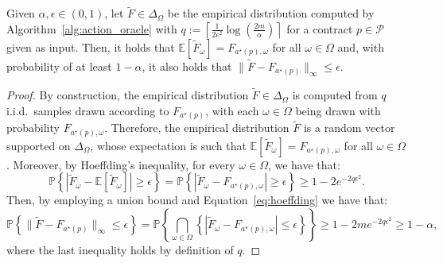 \begin{lemma}\label{lem:hoeffding}
	Given $\alpha, \epsilon \in (0,1)$, let $\widetilde{F} \in \Delta_{\Omega}$ be the empirical distribution computed by Algorithm~\ref{alg:action_oracle} with $q:=\left\lceil \frac{1}{2 \epsilon^2} \log \left(\frac{2 m}{\alpha}\right)\right\rceil $ for a contract $p \in \mathcal{P}$ given as input.
	Then, it holds that $\mathbb{E}[\widetilde{F}_\omega]=F_{a^\star(p),\omega} $ for all $\omega \in \Omega $ and, with probability of at least $1-\alpha$, it also holds that $ \|\widetilde{F}-F_{a^\star(p)} \|_{\infty} \le \epsilon $.
\end{lemma}
\begin{proof}
	By construction, the empirical distribution $\widetilde{F} \in \Delta_\Omega$ is computed from $q$ i.i.d.~samples drawn according to $F_{a^\star(p)}$, with each $\omega \in \Omega$ being drawn with probability $F_{a^\star(p), \omega}$.
	Therefore, the empirical distribution $\widetilde{F}$ is a random vector supported on $\Delta_\Omega$, 
	whose expectation is such that $\mathbb{E}[\widetilde{F}_\omega]=F_{a^\star(p),\omega}$ for all $\omega \in \Omega$.
	Moreover, by Hoeffding’s inequality, for every $\omega \in \Omega$, we have that:
	\begin{equation}\label{eq:hoeffding}
		\mathbb{P}\left\{ |\widetilde{F}_\omega-\mathbb{E}[\widetilde{F}_\omega]| \ge \epsilon \right\} =\mathbb{P} \left\{ |\widetilde{F}_\omega-F_{a^\star(p), \omega}| \ge \epsilon \right\} \ge 1- 2e^{-2q\epsilon^2}.
	\end{equation}
	Then, by employing a union bound and Equation~\eqref{eq:hoeffding} we have that:
	\begin{equation*}
		\mathbb{P}\left\{  \| \widetilde{F} - F_{a^\star(p)} \|_{\infty} \le \epsilon \right\} = \mathbb{P} \left\{  \bigcap_{\omega \in \Omega } \left\{ |\widetilde{F}_\omega-F_{a^\star(p), \omega}| \le \epsilon \right\} \right\} \ge 1 - 2 m e^{-2q\epsilon^2} \ge 1-\alpha,
	\end{equation*}
	where the last inequality holds by definition of $q$.
\end{proof}




